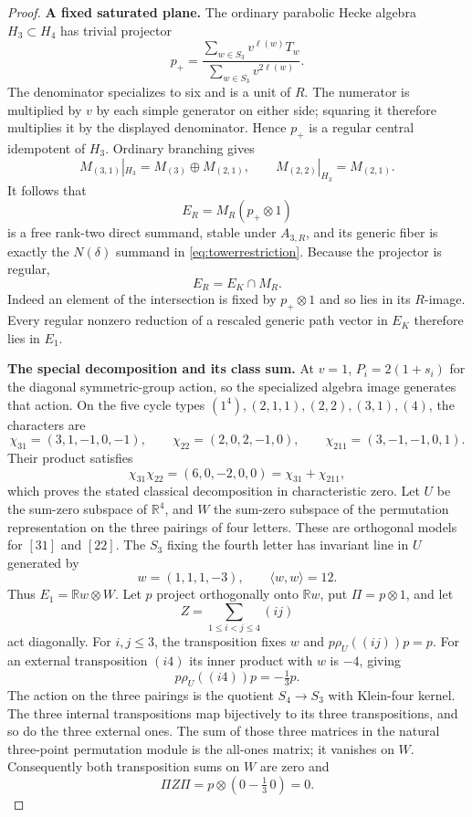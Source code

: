 \begin{proof}
\par\smallskip\noindent\textbf{A fixed saturated plane.}\quad
The ordinary parabolic Hecke algebra $H_3\subset H_4$ has trivial
projector
\[
 p_+=\frac{\sum_{w\in S_3}v^{\ell(w)}T_w}
              {\sum_{w\in S_3}v^{2\ell(w)}}.
\]
The denominator specializes to six and is a unit of $R$. The numerator
is multiplied by $v$ by each simple generator on either side; squaring
it therefore multiplies it by the displayed denominator. Hence $p_+$
is a regular central idempotent of $H_3$. Ordinary branching gives
\[
 M_{(3,1)}|_{H_3}=M_{(3)}\oplus M_{(2,1)},\qquad
 M_{(2,2)}|_{H_3}=M_{(2,1)}.
\]
It follows that
\[
 E_R=M_R(p_+\otimes1)
\]
is a free rank-two direct summand, stable under $A_{3,R}$, and its
generic fiber is exactly the $N(\delta)$ summand in
\eqref{eq:towerrestriction}. Because the projector is regular,
\begin{equation}\label{eq:towersaturated}
 E_R=E_K\cap M_R.
\end{equation}
Indeed an element of the intersection is fixed by $p_+\otimes1$
and so lies in its $R$-image. Every regular nonzero reduction of a
rescaled generic path vector in $E_K$ therefore lies in $E_1$.

\par\smallskip\noindent\textbf{The special decomposition and its class sum.}\quad
At $v=1$, $P_i=2(1+s_i)$ for the diagonal symmetric-group action,
so the specialized algebra image generates that action. On the five
cycle types $(1^4),(2,1,1),(2,2),(3,1),(4)$, the characters are
\[
 \chi_{31}=(3,1,-1,0,-1),\qquad
 \chi_{22}=(2,0,2,-1,0),\qquad
 \chi_{211}=(3,-1,-1,0,1).
\]
Their product satisfies
\[
 \chi_{31}\chi_{22}=(6,0,-2,0,0)=\chi_{31}+\chi_{211},
\]
which proves the stated classical decomposition in characteristic zero.
Let $U$ be the sum-zero subspace of $\mathbb R^4$, and $W$ the
sum-zero subspace of the permutation representation on the three
pairings of four letters. These are orthogonal models for $[31]$
and $[22]$. The $S_3$ fixing the fourth letter has invariant line
in $U$ generated by
\[
 w=(1,1,1,-3),\qquad \langle w,w\rangle=12.
\]
Thus $E_1=\mathbb Rw\otimes W$. Let $p$ project orthogonally onto
$\mathbb Rw$, put $\Pi=p\otimes1$, and let
\[
 Z=\sum_{1\le i<j\le4}(ij)
\]
act diagonally. For $i,j\le3$, the transposition fixes $w$ and
$p\rho_U((ij))p=p$. For an external transposition $(i4)$ its inner
product with $w$ is $-4$, giving
\[
 p\rho_U((i4))p=-\tfrac13p.
\]
The action on the three pairings is the quotient $S_4\to S_3$ with
Klein-four kernel. The three internal transpositions map bijectively
to its three transpositions, and so do the three external ones.
The sum of those three matrices in the natural three-point
permutation module is the all-ones matrix; it vanishes on $W$.
Consequently both transposition sums on $W$ are zero and
\begin{equation}\label{eq:towercompression}
 \Pi Z\Pi=p\otimes(0-\tfrac13\,0)=0.
\end{equation}


\end{proof}
